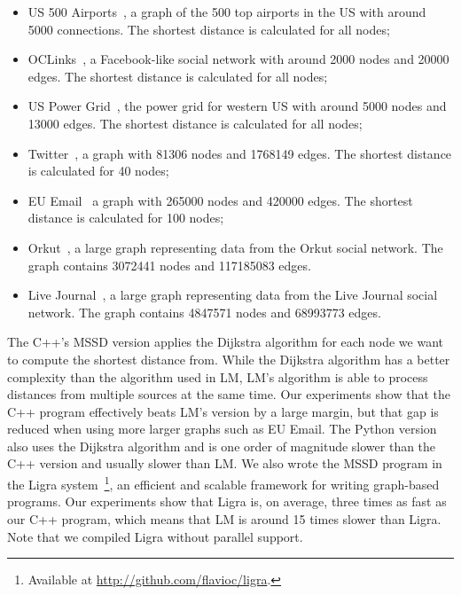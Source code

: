 \begin{itemize}
   \item US 500 Airports~\cite{usairports,tnet}, a graph of the 500 top airports in the US with around
      5000 connections. The shortest distance is calculated for all nodes;
      
   \item OCLinks~\cite{tnet,oclinks}, a Facebook-like social network with around 2000 nodes and 20000 edges. The shortest
      distance is calculated for all nodes;

   \item US Power Grid~\cite{tnet,uspowergrid}, the power grid for western US with around 5000
      nodes and 13000 edges. The shortest distance is calculated for all nodes;

   \item Twitter~\cite{snapnets,NIPS2012_4532}, a graph with 81306 nodes and 1768149 edges.
      The shortest distance is calculated for 40 nodes; 

   \item EU Email~\cite{snapnets,Leskovec:2007:GED:1217299.1217301} a graph with
      265000 nodes and 420000 edges. The shortest distance is calculated for 100
      nodes;

   \item Orkut~\cite{snapnets,Yang:2012:DEN:2350190.2350193}, a large graph
      representing data from the Orkut social network. The graph contains
      3072441 nodes and 117185083 edges.

   \item Live Journal~\cite{snapnets,Backstrom06groupformation}, a large graph representing data from the
      Live Journal social network. The graph contains 4847571 nodes and 68993773
      edges.

\end{itemize}

The C++'s MSSD version applies the Dijkstra algorithm for each node we want to
compute the shortest distance from. While the Dijkstra algorithm has a better
complexity than the algorithm used in LM, LM's algorithm is able to
process distances from multiple sources at the same time. Our experiments show
that the C++ program effectively beats LM's version by a large margin, but that
gap is reduced when using more larger graphs such as EU Email. The Python
version also uses the Dijkstra algorithm and is one order of magnitude slower
than the C++ version and usually slower than LM. We also wrote the MSSD program
in the Ligra system~\cite{Shun:2013:LLG:2517327.2442530}\footnote{Available at
   \url{http://github.com/flavioc/ligra}.}, an efficient and scalable framework
   for writing graph-based programs. Our experiments show that Ligra is, on
   average, three times as fast as our C++ program, which means that LM is
   around 15 times slower than Ligra. Note that we compiled Ligra without
   parallel support.

